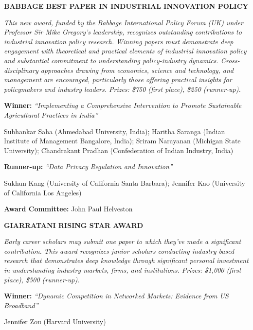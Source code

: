 \documentclass[
  10pt,
  letterpaper,
  DIV=11,
  numbers=noendperiod]{scrartcl}
\begin{document}
{\noindent\textcolor{event}{\textbf{BABBAGE BEST PAPER IN INDUSTRIAL INNOVATION POLICY}}\par\vspace{0.1em}
\noindent\textit{This new award, funded by the Babbage International Policy Forum (UK) under Professor Sir Mike Gregory's leadership, recognizes outstanding contributions to industrial innovation policy research. Winning papers must demonstrate deep engagement with theoretical and practical elements of industrial innovation policy and substantial commitment to understanding policy-industry dynamics. Cross-disciplinary approaches drawing from economics, science and technology, and management are encouraged, particularly those offering practical insights for policymakers and industry leaders. Prizes: \$750 (first place), \$250 (runner-up).}\par\vspace{0.15em}
\noindent \textbf{Winner:} \textit{``Implementing a Comprehensive Intervention to Promote Sustainable Agricultural Practices in India''}\par
\noindent Subhankar Saha (Ahmedabad University, India); Haritha Saranga (Indian Institute of Management Bangalore, India); Sriram Narayanan (Michigan State University); Chandrakant Pradhan (Confederation of Indian Industry, India)\par
\vspace{0.2em}

\noindent \textbf{Runner-up:} \textit{``Data Privacy Regulation and Innovation''}\par
\noindent Sukhun Kang (University of California Santa Barbara); Jennifer Kao (University of California Los Angeles)\par
\vspace{0.2em}

\noindent\textbf{Award Committee:} John Paul Helveston\par
\vspace{0.4em}

\noindent\textcolor{event}{\textbf{GIARRATANI RISING STAR AWARD}}\par\vspace{0.1em}
\noindent\textit{Early career scholars may submit one paper to which they've made a significant contribution. This award recognizes junior scholars conducting industry-based research that demonstrates deep knowledge through significant personal investment in understanding industry markets, firms, and institutions. Prizes: \$1,000 (first place), \$500 (runner-up).}\par\vspace{0.15em}
\noindent \textbf{Winner:} \textit{``Dynamic Competition in Networked Markets: Evidence from US Broadband''}\par
\noindent Jennifer Zou (Harvard University)\par
\vspace{0.2em}

}
\end{document}
